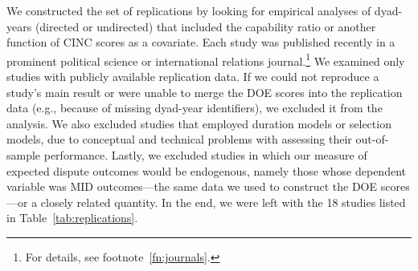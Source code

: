 
We constructed the set of replications by looking for empirical analyses of dyad-years (directed or undirected) that included the capability ratio or another function of CINC scores as a covariate.
Each study was published recently in a prominent political science or international relations journal.\footnote{%
  For details, see footnote~\ref{fn:journals}.
}
We examined only studies with publicly available replication data.
If we could not reproduce a study's main result or were unable to merge the DOE scores into the replication data (e.g., because of missing dyad-year identifiers), we excluded it from the analysis.
We also excluded studies that employed duration models or selection models, due to conceptual and technical problems with assessing their out-of-sample performance.
Lastly, we excluded studies in which our measure of expected dispute outcomes would be endogenous, namely those whose dependent variable was MID outcomes---the same data we used to construct the DOE scores---or a closely related quantity.
In the end, we were left with the 18 studies listed in Table~\ref{tab:replications}.

